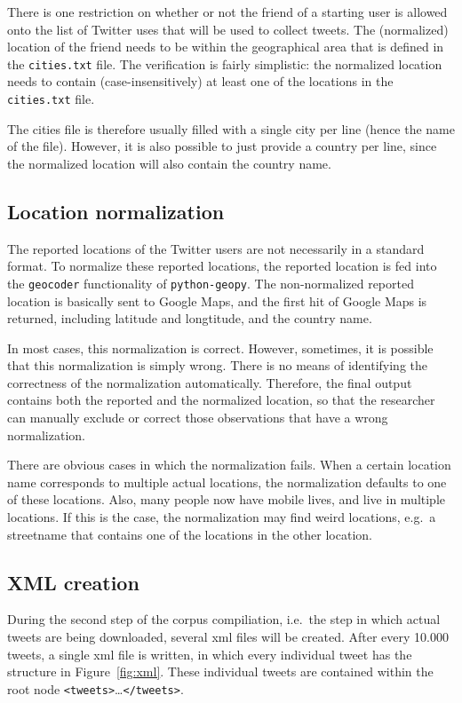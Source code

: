 \documentclass[a4paper,11pt]{article}
\begin{document}
There is one restriction on whether or not the friend of a starting user is allowed onto the list of Twitter uses that will be used to collect tweets. The (normalized) location of the friend needs to be within the geographical area that is defined in the \texttt{cities.txt} file. The verification is fairly simplistic: the normalized location needs to contain (case-insensitively) at least one of the locations in the \texttt{cities.txt} file.

The cities file is therefore usually filled with a single city per line (hence the name of the file). However, it is also possible to just provide a country per line, since the normalized location will also contain the country name.

\subsection{Location normalization}

The reported locations of the Twitter users are not necessarily in a standard format. To normalize these reported locations, the reported location is fed into the \texttt{geocoder} functionality of \texttt{python-geopy}. The non-normalized reported location is basically sent to Google Maps, and the first hit of Google Maps is returned, including latitude and longtitude, and the country name.

In most cases, this normalization is correct. However, sometimes, it is possible that this normalization is simply wrong. There is no means of identifying the correctness of the normalization automatically. Therefore, the final output contains both the reported and the normalized location, so that the researcher can manually exclude or correct those observations that have a wrong normalization.

There are obvious cases in which the normalization fails. When a certain location name corresponds to multiple actual locations, the normalization defaults to one of these locations. Also, many people now have mobile lives, and live in multiple locations. If this is the case, the normalization may find weird locations, e.g.~a streetname that contains one of the locations in the other location.

\subsection{XML creation}

During the second step of the corpus compiliation, i.e.~the step in which actual tweets are being downloaded, several xml files will be created. After every 10.000 tweets, a single xml file is written, in which every individual tweet has the structure in Figure~\ref{fig:xml}. These individual tweets are contained within the root node \texttt{<tweets>}\ldots\texttt{</tweets>}.
\end{document}
